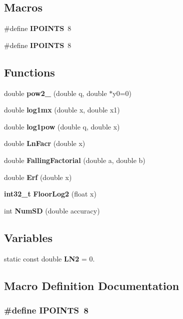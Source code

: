 \subsection*{Macros}
\begin{DoxyCompactItemize}
\item 
\#define {\bf I\-P\-O\-I\-N\-T\-S}~8
\item 
\#define {\bf I\-P\-O\-I\-N\-T\-S}~8
\end{DoxyCompactItemize}
\subsection*{Functions}
\begin{DoxyCompactItemize}
\item 
double {\bf pow2\-\_} (double q, double $\ast$y0=0)
\item 
double {\bf log1mx} (double x, double x1)
\item 
double {\bf log1pow} (double q, double x)
\item 
double {\bf Ln\-Facr} (double x)
\item 
double {\bf Falling\-Factorial} (double a, double b)
\item 
double {\bf Erf} (double x)
\item 
{\bf int32\-\_\-t} {\bf Floor\-Log2} (float x)
\item 
int {\bf Num\-S\-D} (double accuracy)
\end{DoxyCompactItemize}
\subsection*{Variables}
\begin{DoxyCompactItemize}
\item 
static const double {\bf L\-N2} = 0.
\end{DoxyCompactItemize}


\subsection{Macro Definition Documentation}
\subsubsection[{I\-P\-O\-I\-N\-T\-S}]{\setlength{\rightskip}{0pt plus 5cm}\#define I\-P\-O\-I\-N\-T\-S~8}\label{toolboxes_2rnd_2wnchyppr_8cpp_adb83927aaa7629e34f6b1c02e258d255}
